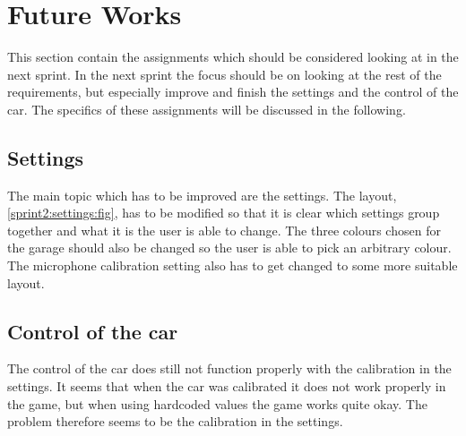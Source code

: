 \section{Future Works}
This section contain the assignments which should be considered looking at in the next sprint.
In the next sprint the focus should be on looking at the rest of the requirements, but especially improve and finish the settings and the control of the car.
The specifics of these assignments will be discussed in the following.

\subsection{Settings}
The main topic which has to be improved are the settings.
The layout, \cref{sprint2:settings:fig}, has to be modified so that it is clear which settings group together and what it is the user is able to change.
The three colours chosen for the garage should also be changed so the user is able to pick an arbitrary colour.
The microphone calibration setting also has to get changed to some more suitable layout.

\subsection{Control of the car}
The control of the car does still not function properly with the calibration in the settings.
It seems that when the car was calibrated it does not work properly in the game, but when using hardcoded values the game works quite okay.
The problem therefore seems to be the calibration in the settings.

